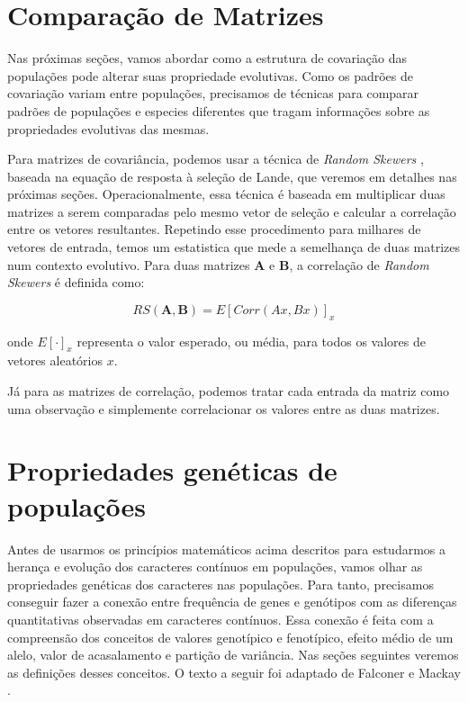 \documentclass[portuges,]{tufte-handout}
\begin{document}
\section{Comparação de Matrizes}\label{comparauxe7uxe3o-de-matrizes}

Nas próximas seções, vamos abordar como a estrutura de covariação das
populações pode alterar suas propriedade evolutivas. Como os padrões de
covariação variam entre populações, precisamos de técnicas para comparar
padrões de populações e especies diferentes que tragam informações sobre
as propriedades evolutivas das mesmas.

Para matrizes de covariância, podemos usar a técnica de \emph{Random
Skewers} \cite{Cheverud2007}, baseada na equação de resposta à
seleção de Lande, que veremos em detalhes nas próximas seções.
Operacionalmente, essa técnica é baseada em multiplicar duas matrizes a
serem comparadas pelo mesmo vetor de seleção e calcular a correlação
entre os vetores resultantes. Repetindo esse procedimento para milhares
de vetores de entrada, temos um estatistica que mede a semelhança de
duas matrizes num contexto evolutivo. Para duas matrizes \(\mathbf{A}\)
e \(\mathbf{B}\), a correlação de \emph{Random Skewers} é definida como:

\[
RS(\mathbf{A}, \mathbf{B}) = E[Corr(Ax, Bx)]_x
\]

onde \(E[\cdot]_x\) representa o valor esperado, ou média, para todos os
valores de vetores aleatórios \(x\).

Já para as matrizes de correlação, podemos tratar cada entrada da matriz
como uma observação e simplemente correlacionar os valores entre as duas
matrizes.

\section{Propriedades genéticas de
populações}\label{propriedades-genuxe9ticas-de-populauxe7uxf5es}

Antes de usarmos os princípios matemáticos acima descritos para
estudarmos a herança e evolução dos caracteres contínuos em populações,
vamos olhar as propriedades genéticas dos caracteres nas populações.
Para tanto, precisamos conseguir fazer a conexão entre frequência de
genes e genótipos com as diferenças quantitativas observadas em
caracteres contínuos. Essa conexão é feita com a compreensão dos
conceitos de valores genotípico e fenotípico, efeito médio de um alelo,
valor de acasalamento e partição de variância. Nas seções seguintes
veremos as definições desses conceitos. O texto a seguir foi adaptado de
Falconer e Mackay \cite{Falconer1996}.
\end{document}
